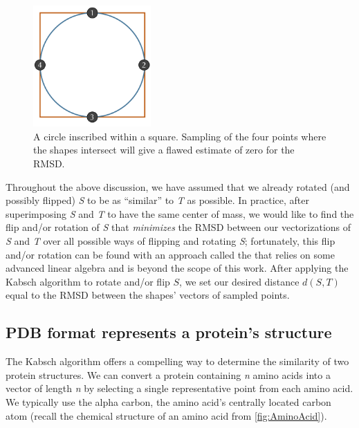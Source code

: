 \begin{figure}[h]
	\centering
	\mySfFamily
	\includegraphics[width = 0.4\textwidth]{../images/circle_square_undersampling.png}
	\caption{A circle inscribed within a square. Sampling of the four points where the shapes intersect will give a flawed estimate of zero for the RMSD.}
	\label{fig:circle_square_undersampling}
\end{figure}

Throughout the above discussion, we have assumed that we already rotated (and possibly flipped) \textit{S} to be as ``similar'' to \textit{T} as possible. In practice, after superimposing \textit{S} and \textit{T} to have the same center of mass, we would like to find the flip and/or rotation of \textit{S} that \textit{minimizes} the RMSD between our vectorizations of \textit{S} and \textit{T} over all possible ways of flipping and rotating \textit{S}; fortunately, this flip and/or rotation can be found with an approach called the  that relies on some advanced linear algebra and is beyond the scope of this work. After applying the Kabsch algorithm to rotate and/or flip $S$, we set our desired distance $d(S, T)$ equal to the RMSD between the shapes' vectors of sampled points.

\subsection{PDB format represents a protein's structure}

The Kabsch algorithm offers a compelling way to determine the similarity of two protein structures. We can convert a protein containing \textit{n} amino acids into a vector of length \textit{n} by selecting a single representative point from each amino acid. We typically use the alpha carbon, the amino acid's centrally located carbon atom (recall the chemical structure of an amino acid from \autoref{fig:AminoAcid}).\\


